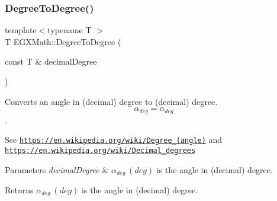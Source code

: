 \subsubsection{\texorpdfstring{Degree\+To\+Degree()}{DegreeToDegree()}}
{\footnotesize\ttfamily template$<$typename T $>$ \\
T E\+G\+X\+Math\+::\+Degree\+To\+Degree (\begin{DoxyParamCaption}\item[{const T \&}]{decimal\+Degree }\end{DoxyParamCaption})}



Converts an angle in (decimal) degree to (decimal) degree. \[\alpha_{deg}=\alpha_{deg}\]. 

See \href{https://en.wikipedia.org/wiki/Degree_(angle)}{\tt https\+://en.\+wikipedia.\+org/wiki/\+Degree\+\_\+(angle)} and \href{https://en.wikipedia.org/wiki/Decimal_degrees}{\tt https\+://en.\+wikipedia.\+org/wiki/\+Decimal\+\_\+degrees} 
\begin{DoxyParams}{Parameters}
{\em decimal\+Degree} & $\alpha_{deg}\ (deg)$ is the angle in (decimal) degree. \\
\hline
\end{DoxyParams}
\begin{DoxyReturn}{Returns}
$\alpha_{deg}\ (deg)$ is the angle in (decimal) degree. 
\end{DoxyReturn}

